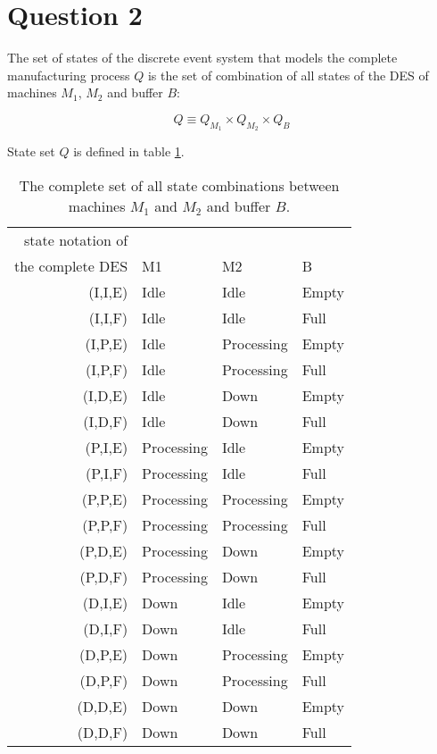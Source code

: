 \section{Question 2}

The set of states of the discrete event system that models the complete
manufacturing process $Q$ is the set of combination of all states of the DES of
machines $M_1$, $M_2$ and buffer $B$:

$$Q \equiv Q_{M_1} \times Q_{M_2} \times Q_{B}$$

State set $Q$ is defined in table \ref{tbl:04.02_all_states}.


\begin{table}\centering
    \begin{tabular}{r|lll}
    state notation of \\ the complete DES & M1         & M2         & B     \\ \hline
    (I,I,E)                            & Idle       & Idle       & Empty \\
    (I,I,F)                            & Idle       & Idle       & Full  \\
    (I,P,E)                            & Idle       & Processing & Empty \\
    (I,P,F)                            & Idle       & Processing & Full  \\
    (I,D,E)                            & Idle       & Down       & Empty \\
    (I,D,F)                            & Idle       & Down       & Full  \\
    (P,I,E)                            & Processing & Idle       & Empty \\
    (P,I,F)                            & Processing & Idle       & Full  \\
    (P,P,E)                            & Processing & Processing & Empty \\
    (P,P,F)                            & Processing & Processing & Full  \\
    (P,D,E)                            & Processing & Down       & Empty \\
    (P,D,F)                            & Processing & Down       & Full  \\
    (D,I,E)                            & Down       & Idle       & Empty \\
    (D,I,F)                            & Down       & Idle       & Full  \\
    (D,P,E)                            & Down       & Processing & Empty \\
    (D,P,F)                            & Down       & Processing & Full  \\
    (D,D,E)                            & Down       & Down       & Empty \\
    (D,D,F)                            & Down       & Down       & Full  \\
    \end{tabular}
    \caption{The complete set of all state combinations between machines $M_1$
      and $M_2$ and buffer $B$.}
    \label{tbl:04.02_all_states}
\end{table}

